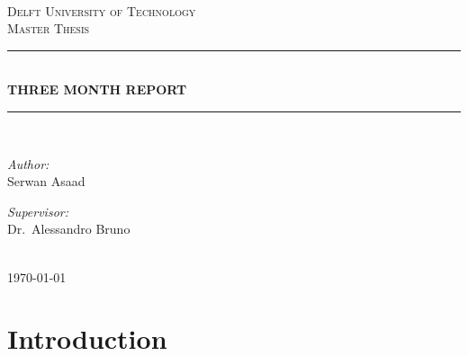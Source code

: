 \documentclass[12pt]{report}
\newcommand{\HRule}[1]{\rule{\linewidth}{#1}}
\begin{document}
\begin{titlepage}
\begin{center}
~\\ [4.0cm]
\textsc{\LARGE Delft University of Technology}
\\ [3.0cm]
\textsc{\Large Master Thesis}
\HRule{0.5pt} \\
\LARGE \textbf{\uppercase{Three month report}}
\HRule{2pt} \\ [0.5cm]

\noindent
\begin{minipage}{0.4\textwidth}
\begin{flushleft} \large
\emph{Author:}\\
Serwan Asaad
\end{flushleft}
\end{minipage}%
\begin{minipage}{0.4\textwidth}
\begin{flushright} \large
\emph{Supervisor:} \\
Dr.~Alessandro Bruno
\end{flushright}
\end{minipage}
\\ [3.0cm]
{\large \today}
\end{center}

\end{titlepage}


\author{
        Serwan Asaad
        Student ID: 4323475 \\
        Delft University of Technology \\
        Kavli Institute of Nanoschience\\
        Quantum Nanoscience Department\\
        Quantum Transport Group\\
        DiCarlo Lab}

\tableofcontents
\newpage

\sectionfont{\scshape}


\section*{Introduction}
\end{document}
